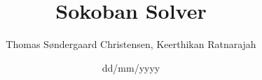 \documentclass[a4paper,10pt]{article}
\title{Sokoban Solver}
\author{Thomas Søndergaard Christensen, Keerthikan Ratnarajah}
\date{dd/mm/yyyy}
\begin{document}


\newpage
\tableofcontents
\newpage
\listoffigures
\listoftables
\listoftodos
\clearpage
\newpage


\newpage

\end{document}
